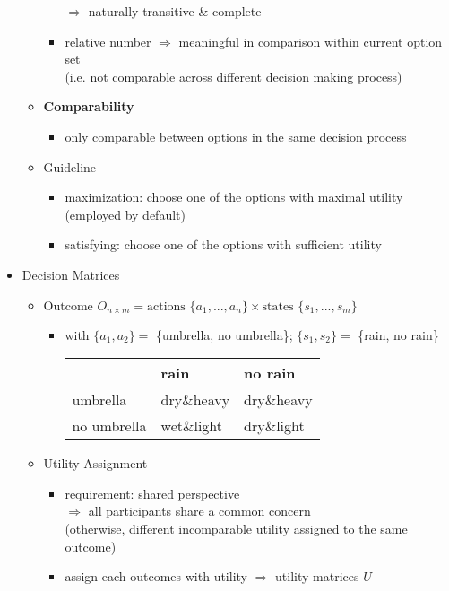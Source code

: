 \begin{itemize}
\begin{itemize}
\begin{itemize}
		$\Rightarrow$ naturally transitive \& complete
		\item relative number $\Rightarrow$ meaningful in comparison within current option set \\
		(i.e. not comparable across different decision making process)
		\end{itemize} 
	\item \textbf{Comparability}
		\begin{itemize}
		\item only comparable between options in the same decision process
		\end{itemize}
	\item Guideline
		\begin{itemize}
		\item maximization: choose one of the options with maximal utility \\ 
		(employed by default)
		\item satisfying: choose one of the options with sufficient utility
		\end{itemize}
	\end{itemize}
\item Decision Matrices
	\begin{itemize}
	\item $\text{Outcome } O_{n\times m}=\text{actions }\{a_1,...,a_n\} \times\text{states }\{s_1,...,s_m\}$
		\begin{itemize}
		\item with $\{a_1,a_2\} =$ \{umbrella, no umbrella\}; $\{s_1,s_2\}=$ \{rain, no rain\} \\
		\begin{tabular*}{0.5\linewidth}{l|ll}
			            & rain       & no rain    \\
			\hline
			umbrella    & dry\&heavy & dry\&heavy \\
			no umbrella & wet\&light & dry\&light
		\end{tabular*}
		\end{itemize}
	\item Utility Assignment
		\begin{itemize}
		\item requirement: shared perspective \\
		$\Rightarrow$ all participants share a common concern \\
		(otherwise, different incomparable utility assigned to the same outcome)
		\item assign each outcomes with utility $\Rightarrow$ utility matrices $U$ \\

\end{itemize}
\end{itemize}
\end{itemize}

